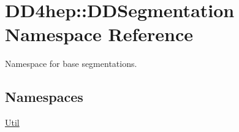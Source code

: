 \hypertarget{namespace_d_d4hep_1_1_d_d_segmentation}{}\section{D\+D4hep\+:\+:D\+D\+Segmentation Namespace Reference}
\label{namespace_d_d4hep_1_1_d_d_segmentation}


Namespace for base segmentations.  


\subsection*{Namespaces}
\begin{DoxyCompactItemize}
\item 
 \hyperlink{namespace_d_d4hep_1_1_d_d_segmentation_1_1_util}{Util}
\end{DoxyCompactItemize}
